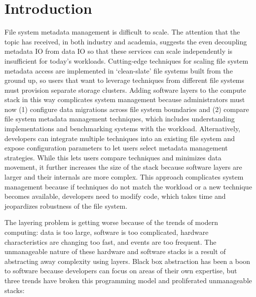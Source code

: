 \chapter{Introduction}

File system metadata management is difficult to scale. The attention that the
topic has received, in both industry and academia, suggests the even decoupling
metadata IO from data IO so that these services can scale independently is
insufficient for today's workloads.  Cutting-edge techniques for scaling file
system metadata access are implemented in `clean-slate' file systems built from
the ground up, so users that want to leverage techniques from different file
systems must provision separate storage clusters. Adding software layers to the
compute stack in this way complicates system management because administrators
must now (1) configure data migrations across file system boundaries and (2)
compare file system metadata management techniques, which includes
understanding implementations and benchmarking systems with the workload.
Alternatively, developers can integrate multiple techniques into an existing
file system and expose configuration parameters to let users select metadata
management strategies. While this lets users compare techniques and minimizes
data movement, it further increases the size of the stack because software
layers are larger and their internals are more complex. This approach
complicates system management because if techniques do not match the workload
or a new technique becomes available, developers need to modify code, which
takes time and jeopardizes robustness of the file system. 


The layering problem is getting worse because of the trends of modern
computing: data is too large, software is too complicated, hardware
characteristics are changing too fast, and events are too frequent. The
unmanageable nature of these hardware and software stacks is a result of
abstracting away complexity using layers. Black box abstraction has been a boon
to software because developers can focus on areas of their own expertise, but
three trends have broken this programming model and proliferated unmanageable
stacks:

